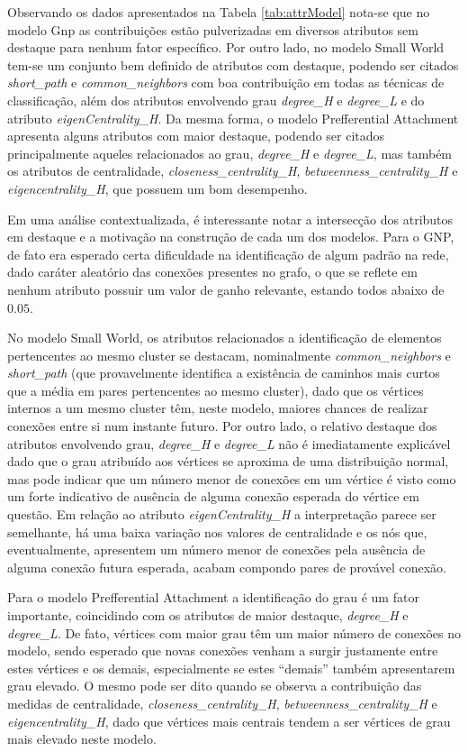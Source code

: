 \documentclass[a4paper,11pt]{article}
\begin{document}
Observando os dados apresentados na Tabela \ref{tab:attrModel} nota-se que no modelo Gnp as contribuições estão pulverizadas em diversos atributos sem destaque para nenhum fator específico. 
Por outro lado, no modelo Small World tem-se um conjunto bem definido de atributos com destaque, podendo ser citados \textit{short\_path} e \textit{common\_neighbors} com boa contribuição em todas as técnicas de classificação, além dos atributos envolvendo grau \textit{degree\_H} e \textit{degree\_L} e do atributo \textit{eigenCentrality\_H}. 
Da mesma forma, o modelo Prefferential Attachment apresenta alguns atributos com maior destaque, podendo ser citados principalmente aqueles relacionados ao grau, \textit{degree\_H} e \textit{degree\_L}, mas também os atributos de centralidade, \textit{closeness\_centrality\_H}, \textit{betweenness\_centrality\_H} e \textit{eigencentrality\_H}, que possuem um bom desempenho.

Em uma análise contextualizada, é interessante notar a intersecção dos atributos em destaque e a motivação na construção de cada um dos modelos. Para o GNP, de fato era esperado certa dificuldade  na identificação de algum padrão na rede, dado  caráter aleatório das conexões presentes no grafo, o que se reflete em nenhum atributo possuir um valor de ganho relevante, estando todos abaixo de $0.05$. 

No modelo Small World, os atributos relacionados a identificação de elementos pertencentes ao mesmo cluster se destacam, nominalmente \textit{common\_neighbors} e \textit{short\_path} (que provavelmente identifica a existência de caminhos mais curtos que a média em pares pertencentes ao mesmo cluster), dado que os vértices internos a um mesmo cluster têm, neste modelo, maiores chances de realizar conexões entre si num instante futuro. Por outro lado, o relativo destaque dos atributos envolvendo grau, \textit{degree\_H} e \textit{degree\_L} não é imediatamente explicável dado que o grau atribuído aos vértices se aproxima de uma distribuição normal, mas pode indicar que um número menor de conexões em um vértice é visto como um forte indicativo de ausência de alguma conexão esperada do vértice em questão. Em relação ao atributo \textit{eigenCentrality\_H} a interpretação parece ser semelhante, há uma baixa variação nos valores de centralidade e os nós que, eventualmente, apresentem um número menor de conexões pela ausência de alguma conexão futura esperada, acabam compondo pares de provável conexão.

Para o modelo Prefferential Attachment a identificação do grau é um fator importante, coincidindo com os atributos de maior destaque, \textit{degree\_H} e \textit{degree\_L}. De fato, vértices com maior grau têm um maior número de conexões no modelo, sendo esperado que novas conexões venham a surgir justamente entre estes vértices e os demais, especialmente se estes ``demais'' também apresentarem grau elevado. O mesmo pode ser dito quando se observa a contribuição das medidas de centralidade, \textit{closeness\_centrality\_H}, \textit{betweenness\_centrality\_H} e \textit{eigencentrality\_H}, dado que vértices mais centrais tendem a ser vértices de grau mais elevado neste modelo.
\end{document}
